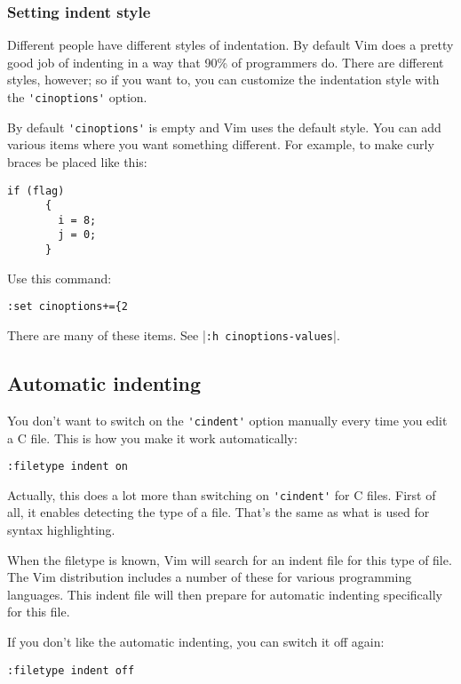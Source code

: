\subsubsection{Setting indent style}
Different people have different styles of indentation.
By default Vim does a pretty good job of indenting in a way that 90\% of programmers do.
There are different styles, however; so if you want to, you can customize the indentation style with the \verb!'cinoptions'! option.

By default \verb!'cinoptions'! is empty and Vim uses the default style.
You can add various items where you want something different.
For example, to make curly braces be placed like this:

\begin{Verbatim}[samepage=true]
    if (flag) 
      { 
        i = 8; 
        j = 0; 
      } 
\end{Verbatim}

Use this command:

\begin{Verbatim}[samepage=true]
 :set cinoptions+={2
\end{Verbatim}

There are many of these items.  See |\verb!:h cinoptions-values!|.
\subsection{Automatic indenting}
You don't want to switch on the \verb!'cindent'! option manually every time you edit a C file.
This is how you make it work automatically:

\begin{Verbatim}[samepage=true]
 :filetype indent on
\end{Verbatim}

Actually, this does a lot more than switching on \verb!'cindent'! for C files.
First of all, it enables detecting the type of a file.
That's the same as what is used for syntax highlighting.

When the filetype is known, Vim will search for an indent file for this type of file.
The Vim distribution includes a number of these for various programming languages.
This indent file will then prepare for automatic indenting specifically for this file.

If you don't like the automatic indenting, you can switch it off again:

\begin{Verbatim}[samepage=true]
 :filetype indent off
\end{Verbatim}

